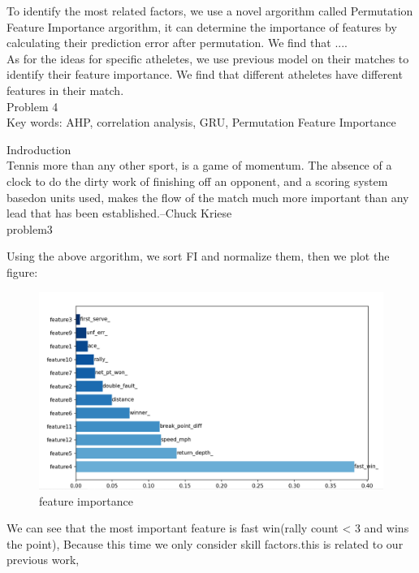 To identify the most related factors, we use a novel argorithm called Permutation Feature Importance argorithm, 
it can determine the importance of features by calculating their prediction error after permutation. We find that ....\\

As for the ideas for specific atheletes, we use previous model on their matches to identify their feature importance.
We find that different atheletes have different features in their match.\\

Problem 4\\

Key words: AHP, correlation analysis, GRU, Permutation Feature Importance

Indroduction\\
Tennis more than any other sport, is a game of momentum. 
The absence of a clock to do the dirty work of finishing off an opponent, 
and a scoring system basedon units used, makes the flow of the match much more important than any 
lead that has been established.--Chuck Kriese\\

problem3

Using the above argorithm, we sort FI and normalize them, then we plot the figure:

\begin{figure}[H]
    \centering
    \includegraphics[scale=0.6]{mainmatter/imgs/8.png}
    \caption{feature importance}
\end{figure}

We can see that the most important feature is fast win(rally count < 3 and wins the point),
Because this time we only consider skill factors.this is related to our previous work,